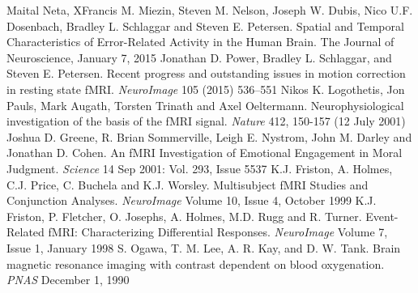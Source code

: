 \documentclass[12pt]{article}
\begin{document}
\begin{thebibliography}{1}
 Maital Neta, XFrancis M. Miezin, Steven M. Nelson, Joseph W. Dubis, Nico U.F. Dosenbach, Bradley L. Schlaggar and Steven E. Petersen. Spatial and Temporal Characteristics of Error-Related Activity in the Human Brain. The Journal of Neuroscience, January 7, 2015
 Jonathan D. Power, Bradley L. Schlaggar, and Steven E. Petersen. Recent progress and outstanding issues in motion correction in resting state fMRI. \textit{NeuroImage} 105 (2015) 536–551
 Nikos K. Logothetis, Jon Pauls, Mark Augath, Torsten Trinath and Axel Oeltermann. Neurophysiological investigation of the basis of the fMRI signal. \textit{Nature} 412, 150-157 (12 July 2001)
Joshua D. Greene, R. Brian Sommerville, Leigh E. Nystrom, John M. Darley and Jonathan D. Cohen. An fMRI Investigation of Emotional Engagement in Moral Judgment. \textit{Science}  14 Sep 2001: Vol. 293, Issue 5537
 K.J. Friston, A. Holmes, C.J. Price, C. Buchela and K.J. Worsley. Multisubject fMRI Studies and Conjunction Analyses. \textit{NeuroImage} Volume 10, Issue 4, October 1999
 K.J. Friston, P. Fletcher, O. Josephs, A. Holmes, M.D. Rugg and R. Turner. Event-Related fMRI: Characterizing Differential Responses. \textit{NeuroImage} Volume 7, Issue 1, January 1998
 S. Ogawa, T. M. Lee, A. R. Kay, and D. W. Tank. Brain magnetic resonance imaging with contrast dependent on blood oxygenation. \textit{PNAS} December 1, 1990
\end{thebibliography}
\end{document}
